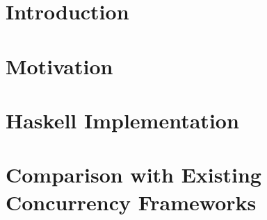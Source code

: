 \documentclass[sigplan,screen,review]{acmart}
\begin{document}
\section{Introduction}

\section{Motivation}

\section{Haskell Implementation}

\section{Comparison with Existing Concurrency Frameworks}
\end{document}
